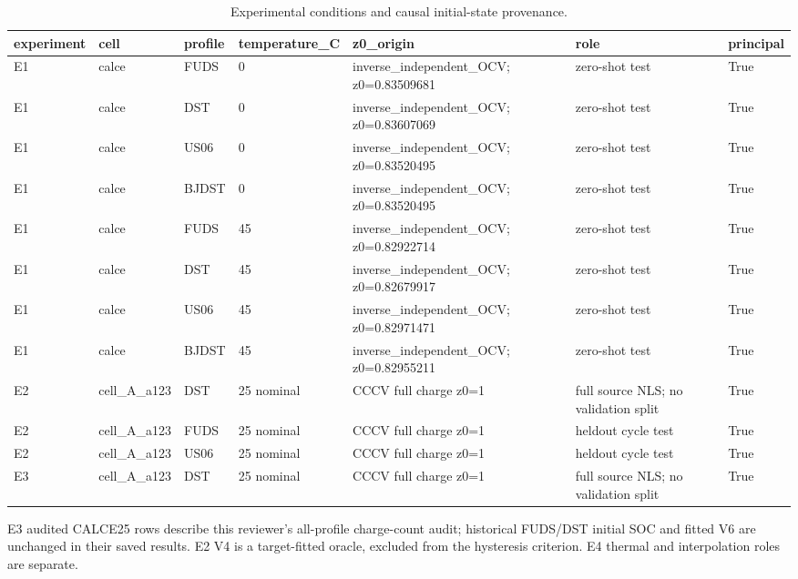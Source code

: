 \begin{table}[!t]
\centering
\footnotesize
\caption{Experimental conditions and causal initial-state provenance.}
\label{tab:reviewer-conditions-2}
\setlength{\tabcolsep}{3pt}
\begin{tabular}{llll p{} p{} l}
\toprule
experiment & cell & profile & temperature\_C & z0\_origin & role & principal \\
\midrule
E1 & calce & FUDS & 0 & inverse\_independent\_OCV; z0=0.83509681 & zero-shot test & True \\
E1 & calce & DST & 0 & inverse\_independent\_OCV; z0=0.83607069 & zero-shot test & True \\
E1 & calce & US06 & 0 & inverse\_independent\_OCV; z0=0.83520495 & zero-shot test & True \\
E1 & calce & BJDST & 0 & inverse\_independent\_OCV; z0=0.83520495 & zero-shot test & True \\
E1 & calce & FUDS & 45 & inverse\_independent\_OCV; z0=0.82922714 & zero-shot test & True \\
E1 & calce & DST & 45 & inverse\_independent\_OCV; z0=0.82679917 & zero-shot test & True \\
E1 & calce & US06 & 45 & inverse\_independent\_OCV; z0=0.82971471 & zero-shot test & True \\
E1 & calce & BJDST & 45 & inverse\_independent\_OCV; z0=0.82955211 & zero-shot test & True \\
E2 & cell\_A\_a123 & DST & 25 nominal & CCCV full charge z0=1 & full source NLS; no validation split & True \\
E2 & cell\_A\_a123 & FUDS & 25 nominal & CCCV full charge z0=1 & heldout cycle test & True \\
E2 & cell\_A\_a123 & US06 & 25 nominal & CCCV full charge z0=1 & heldout cycle test & True \\
E3 & cell\_A\_a123 & DST & 25 nominal & CCCV full charge z0=1 & full source NLS; no validation split & True \\
\bottomrule
\end{tabular}
\par\smallskip\begin{minipage}{0.98\textwidth}\footnotesize E3 audited CALCE25 rows describe this reviewer's all-profile charge-count audit; historical FUDS/DST initial SOC and fitted V6 are unchanged in their saved results. E2 V4 is a target-fitted oracle, excluded from the hysteresis criterion. E4 thermal and interpolation roles are separate.\end{minipage}
\end{table}

